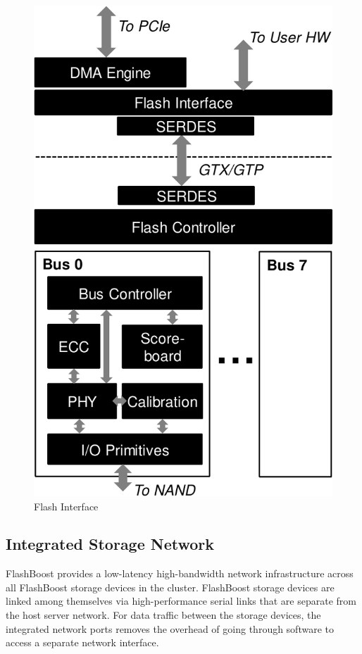 \begin{figure}[h]
	\begin{center}
	\includegraphics[scale=0.4]{figures/top-arch-crop.pdf}
	\caption{Flash Interface}
	\label{fig:flashinterface}
	\end{center}
\end{figure}

\subsection{Integrated Storage Network}

FlashBoost provides a low-latency high-bandwidth network infrastructure across
all FlashBoost storage devices in the cluster.  FlashBoost storage devices are
linked among themselves via high-performance serial links that are separate from
the host server network. For data traffic between the storage devices, the
integrated network ports removes the overhead of going through software to
access a separate network interface.

